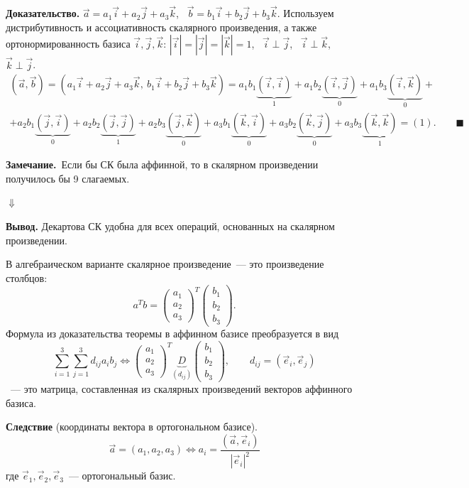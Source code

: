 \documentclass[a4paper,11pt]{article}
\newcommand{\zam}{\textbf{Замечание.}\ }
\begin{document}
\textbf{Доказательство.} $\vec a=a_1\vec i+a_2\vec j+a_3\vec k$, \ $\vec b=b_1\vec i+b_2\vec j+b_3\vec k$. Используем дистрибутивность и
ассоциативность скалярного произведения, а также ортонормированность базиса $\vec i,\vec j,\vec k$:
$|\vec i|=|\vec j|=|\vec k|=1$, \ $\vec i\perp\vec j$, \ $\vec i\perp\vec k$, \ $\vec k\perp\vec j$.
\begin{multline*}
(\vec a,\vec b)=(a_1\vec i+a_2\vec j+a_3\vec k,\ b_1\vec i+b_2\vec j+b_3\vec k)=
a_1b_1\underbrace{(\vec i,\vec i)}_{1}+a_1b_2\underbrace{(\vec i,\vec j)}_{0}+a_1b_3\underbrace{(\vec i,\vec k)}_{0}+{}\\
+a_2b_1\underbrace{(\vec j,\vec i)}_{0}+a_2b_2\underbrace{(\vec j,\vec j)}_{1}+a_2b_3\underbrace{(\vec j,\vec k)}_{0}
+a_3b_1\underbrace{(\vec k,\vec i)}_{0}+a_3b_2\underbrace{(\vec k,\vec j)}_{0}+a_3b_3\underbrace{(\vec k,\vec k)}_{1}
\overset{}{=}(1).\qquad\blacksquare
\end{multline*}

\zam Если бы СК была аффинной, то в скалярном произведении получилось бы 9 слагаемых.

$\Downarrow$

\textbf{Вывод.} Декартова СК удобна для всех операций, основанных на скалярном произведении.

В алгебраическом варианте скалярное произведение~--- это произведение столбцов:
\[
a^Tb=\begin{pmatrix}a_1\\a_2\\a_3\end{pmatrix}^T\begin{pmatrix}b_1\\b_2\\b_3\end{pmatrix}.
\]
Формула из доказательства теоремы в аффинном базисе преобразуется в вид
\[
\sum_{i=1}^3\sum_{j=1}^3 d_{ij}a_ib_j\iff
\begin{pmatrix}a_1\\a_2\\a_3\end{pmatrix}^T\underbrace{D}_{(d_{ij})}\begin{pmatrix}b_1\\b_2\\b_3\end{pmatrix},
\qquad d_{ij}=(\vec e_i,\vec e_j)
\]
~--- это матрица, составленная из скалярных произведений векторов аффинного базиса.

\textbf{Следствие} (координаты вектора в ортогональном базисе).
\[
\boxed{\ \vec a=(a_1,a_2,a_3)\iff a_i=\frac{(\vec a,\vec e_i)}{|\vec e_i|^2}\ }\tag{2}
\]
где $\vec e_1,\vec e_2,\vec e_3$~--- ортогональный базис.
\end{document}
